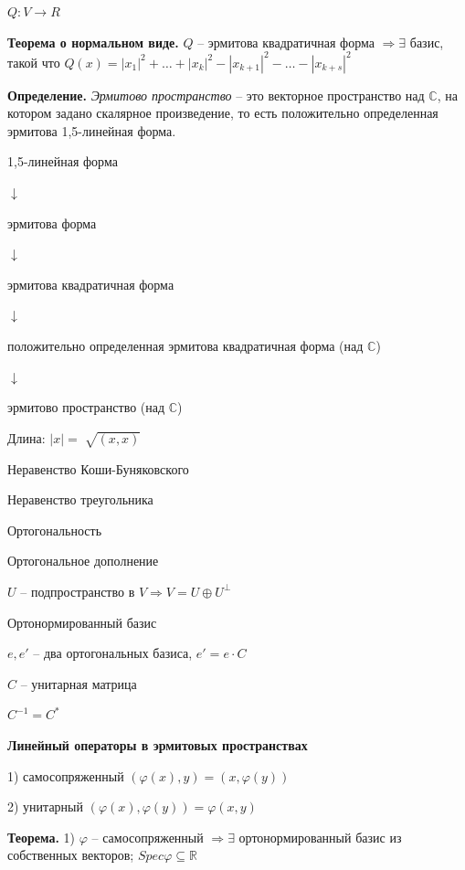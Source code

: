 \vspace{\baselineskip}
$Q:V \rightarrow R$

\textbf{Теорема о нормальном виде.} $Q$ -- эрмитова квадратичная форма $\Rightarrow \exists$ базис, такой что $Q(x) = |x_1|^2 + \dots + |x_k|^2 - |x_{k+1}|^2 - \dots - |x_{k + s}|^2$

\vspace{\baselineskip}
\textbf{Определение.} \textit{Эрмитово пространство} -- это векторное пространство над $\mathbb{C}$, на котором задано скалярное произведение, то есть положительно определенная эрмитова 1,5-линейная форма.

\vspace{\baselineskip}
1,5-линейная форма

$\downarrow$

эрмитова форма

$\downarrow$

эрмитова квадратичная форма

$\downarrow$

положительно определенная эрмитова квадратичная форма (над $\mathbb{C}$)

$\downarrow$

эрмитово пространство (над $\mathbb{C}$)

\vspace{\baselineskip}
Длина: $|x| = \sqrt[]{(x, x)}$

Неравенство Коши-Буняковского

Неравенство треугольника

Ортогональность

Ортогональное дополнение

$U$ -- подпространство в $V \Rightarrow V = U \oplus U^{\bot}$

Ортонормированный базис

\vspace{\baselineskip}
$e, e'$ -- два ортогональных базиса, $e' = e \cdot C$

$C$ -- унитарная матрица

$C^{-1} = C^*$

\vspace{\baselineskip}
\textbf{Линейный операторы в эрмитовых пространствах}

1) самосопряженный $(\varphi(x), y) = (x, \varphi(y))$

2) унитарный $(\varphi(x), \varphi(y)) = \varphi(x, y)$

\vspace{\baselineskip}
\textbf{Теорема.} 1) $\varphi$ -- самосопряженный $\Rightarrow \exists$ ортонормированный базис из собственных векторов; $Spec \varphi \subseteq \mathbb{R}$

